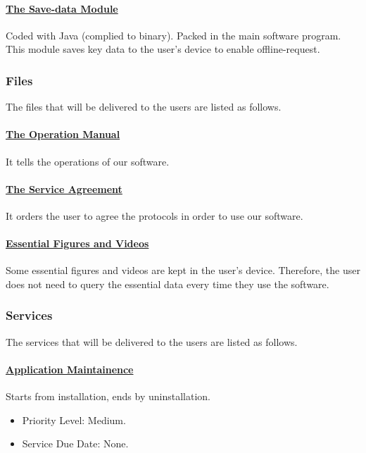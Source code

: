 \documentclass[10pt]{article}
\begin{document}
\paragraph{\underline{The Save-data Module}} Coded with Java (complied to binary). Packed in the main software program. This module saves key data to the user's device to enable offline-request.

\subsubsection{Files}
The files that will be delivered to the users are listed as follows.

\paragraph{\underline{The Operation Manual}} It tells the operations of our software.

\paragraph{\underline{The Service Agreement}} It orders the user to agree the protocols in order to use our software. 

\paragraph{\underline{Essential Figures and Videos}} Some essential figures and videos are kept in the user's device. Therefore, the user does not need to query the essential data every time they use the software. 


\subsubsection{Services}
The services that will be delivered to the users are listed as follows.

\paragraph{\underline{Application Maintainence}} Starts from installation, ends by uninstallation. 

\begin{itemize}
	\item Priority Level: Medium. 
	\item Service Due Date: None.
\end{itemize}
\end{document}
